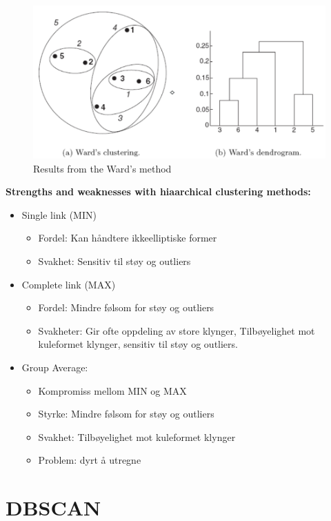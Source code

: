			\begin{figure}[H]
				\centering
				\includegraphics[scale=0.3]{pics/ward.png}
				\caption{Results from the Ward's method}
			\end{figure}
		\clearpage
		{\bf Strengths and weaknesses with hiaarchical clustering methods:}
			\begin{itemize}
				\item Single link (MIN)
					\begin{itemize}
						\item Fordel: Kan håndtere ikkeelliptiske former 
						\item Svakhet: Sensitiv til støy og outliers 
					\end{itemize}
				\item Complete link (MAX)
					\begin{itemize}
						\item Fordel: Mindre følsom for støy og outliers 
						\item Svakheter: Gir ofte oppdeling av store klynger,
						Tilbøyelighet mot kuleformet klynger, sensitiv til støy og outliers.
					\end{itemize}
				\item Group Average:
					\begin{itemize}
						\item Kompromiss mellom MIN og MAX 
						\item Styrke: Mindre følsom for støy og outliers 
						\item Svakhet: Tilbøyelighet mot kuleformet klynger
						\item Problem: dyrt å utregne
					\end{itemize}
			\end{itemize}

	\section{DBSCAN}		

